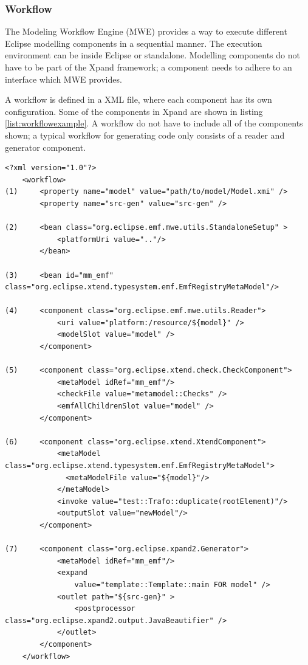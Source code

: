 \subsubsection{Workflow}\label{subsub:workflow}
The Modeling Workflow Engine (MWE) provides a way to execute different Eclipse modelling components in a sequential manner. The execution environment can be inside Eclipse or standalone. Modelling components do not have to be part of the Xpand framework; a component needs to adhere to an interface which MWE provides.

A workflow is defined in a XML file, where each component has its own configuration. Some of the components in Xpand are shown in listing \ref{list:workflowexample}. A workflow do not have to include all of the components shown; a typical workflow for generating code only consists of a reader and generator component.
\newpage
\lstset{language=XML,caption=An example MWE workflow file,label=list:workflowexample,captionpos=b,breaklines=true}
\begin{table}[htpb]
  \centering  
  \begin{lstlisting}[showstringspaces=false]
    <?xml version="1.0"?>
    <workflow>
(1)	    <property name="model" value="path/to/model/Model.xmi" />
	    <property name="src-gen" value="src-gen" />
	    
(2)	    <bean class="org.eclipse.emf.mwe.utils.StandaloneSetup" >
		    <platformUri value=".."/>
	    </bean>
	    
(3)	    <bean id="mm_emf" class="org.eclipse.xtend.typesystem.emf.EmfRegistryMetaModel"/>

(4)	    <component class="org.eclipse.emf.mwe.utils.Reader">
		    <uri value="platform:/resource/${model}" />
		    <modelSlot value="model" />
	    </component>

(5)	    <component class="org.eclipse.xtend.check.CheckComponent">
		    <metaModel idRef="mm_emf"/>
		    <checkFile value="metamodel::Checks" />
		    <emfAllChildrenSlot value="model" />
	    </component>

(6)	    <component class="org.eclipse.xtend.XtendComponent">
		    <metaModel class="org.eclipse.xtend.typesystem.emf.EmfRegistryMetaModel">
			  <metaModelFile value="${model}"/>
		    </metaModel>
		    <invoke value="test::Trafo::duplicate(rootElement)"/>
		    <outputSlot value="newModel"/>
	    </component>

(7)	    <component class="org.eclipse.xpand2.Generator">
		    <metaModel idRef="mm_emf"/>
		    <expand
			    value="template::Template::main FOR model" />
		    <outlet path="${src-gen}" >
			    <postprocessor class="org.eclipse.xpand2.output.JavaBeautifier" />
		    </outlet>
	    </component>
    </workflow>
  \end{lstlisting}
\end{table}

